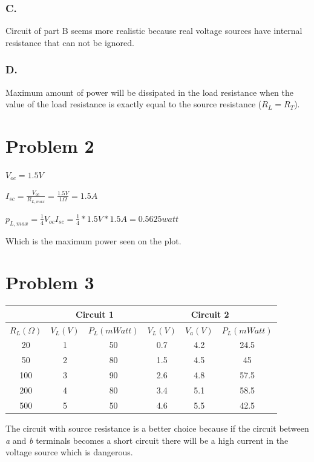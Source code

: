 \documentclass{report}
\begin{document}
            \subsubsection*{C.}
                Circuit of part B seems more realistic because real voltage sources have internal resistance that can not be ignored.
            \subsubsection*{D.}
                Maximum amount of power will be dissipated in the load resistance when the value of the load resistance is exactly equal to the source resistance ($R_L = R_T$).
    \section*{Problem 2}
    {
        $V_{oc} = 1.5 V$

        $I_{sc} = \frac{V_{oc}}{R_{L, max}} = \frac{1.5 V}{1 \Omega} = 1.5 A$

        $p_{L, max} = \frac{1}{4} V_{oc} I_{sc} = \frac{1}{4} * 1.5 V * 1.5 A = \boxed{0.5625 watt}$

        Which is the maximum power seen on the plot.

    }
    \section*{Problem 3}
    \begin{multicols}{2}\setlength{\columnseprule}{0pt}
        \begin{center}
            \scalebox{0.8}
            {
		\renewcommand{\arraystretch}{1.2} %
                \begin{tabular}{|c|c|c|c|c|c|}
                    \hline
                    & \multicolumn{2}{c|}{Circuit 1} & \multicolumn{3}{c|}{Circuit 2} \\
                    \hline
                    \textbf{$R_L(\Omega)$} & \textbf{$V_L(V)$} & \textbf{$P_L(mWatt)$} & \textbf{$V_L(V)$} & \textbf{$V_a(V)$} & \textbf{$P_L(mWatt)$} \\
                    \hline
                    20   & 1 & 50 & 0.7 & 4.2 & 24.5 \\
                    50   & 2 & 80 & 1.5 & 4.5 & 45 \\
                    100 & 3 & 90 & 2.6 & 4.8 & 57.5 \\
                    200 & 4 & 80 & 3.4 & 5.1 & 58.5 \\
                    500 & 5 & 50 & 4.6 & 5.5 & 42.5 \\
                    \hline
                \end{tabular}
            }
        \end{center}
        \vfill\null
        \columnbreak
        The circuit with source resistance is a better choice because
        if the circuit between \textit{a} and \textit{b} terminals becomes a short circuit
        there will be a high current in the voltage source which is dangerous.
    \end{multicols}
\end{document}
